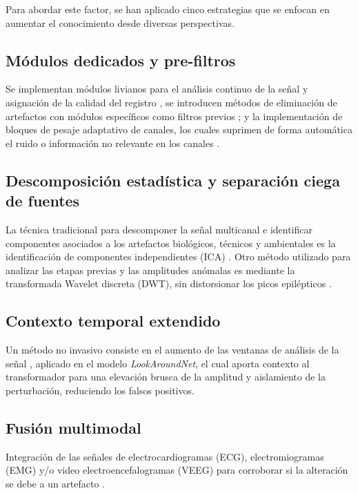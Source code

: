 Para abordar este factor, se han aplicado cinco estrategias que se enfocan en aumentar el conocimiento desde diversas perspectivas.

\subsection{Módulos dedicados y pre-filtros}
Se implementan módulos livianos para el análisis continuo de la señal y asignación de la calidad del registro \cite{afsariArtificialIntelligenceEpileptic2026}, se introducen métodos de eliminación de artefactos con módulos específicos como filtros previos \cite{slamaComprehensiveReviewMachine2025}; y la implementación de bloques de pesaje adaptativo de canales, los cuales suprimen de forma automática el ruido o información no relevante en los canales \cite{zhangFPMBGCNFeaturePyramidbased2026}.

\subsection{Descomposición estadística y separación ciega de fuentes}
La técnica tradicional para descomponer la señal multicanal e identificar componentes asociados a los artefactos biológicos, técnicos y ambientales es la identificación de componentes independientes (ICA) \cite{craik2019deep, dasEnhancedEEGSignal2025, djemal2025fast, slamaComprehensiveReviewMachine2025, wu_review_2025}. Otro método utilizado para analizar las etapas previas y las amplitudes anómalas es mediante la transformada Wavelet discreta (DWT), sin distorsionar los picos epilépticos \cite{djemal2025fast}.

\subsection{Contexto temporal extendido}
Un método no invasivo consiste en el aumento de las ventanas de análisis de la señal \cite{sverrisson2026lookaroundnet}, aplicado en el modelo \textit{LookAroundNet}, el cual aporta contexto al transformador para una elevación brusca de la amplitud y aislamiento de la perturbación, reduciendo los falsos positivos.

\subsection{Fusión multimodal}
Integración de las señales de electrocardiogramas (ECG), electromiogramas (EMG) y/o video electroencefalogramas (VEEG) para corroborar si la alteración se debe a un artefacto \cite{afsariArtificialIntelligenceEpileptic2026}.

